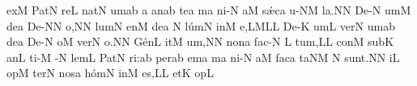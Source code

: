 \sgn {}ex\punctum M\egn
\spatium
\sgn P{a}t\punctum N\egn
\sgn re{}\punctum L\egn
\spatium
\sgn n{a}t\punctum N\egn
\sgn {}um\punctum a\augmentum b\egn
\spatium
\divisiominima
\spatium
\custos a
\lineaproxima
\sgn {}an\pes ab\egn
\sgn te{}\punctum a\egn
\spatium
{}m\punctum a\egn
\sgn ni-\punctum N\egn
\sgn {}a{}\punctum M\egn
\spatium
\sgn s{\'\ae}c\punctum a\egn
\sgn {}u-\clivis NM\egn
\sgn la.\punctum N\augmentum N\egn
\spatium
\divisiofinalis
\spatium
\sgn D{e}-\punctum N\egn
\sgn {}um\punctum M\egn
\spatium
\sgn de{}\punctum a\egn
\spatium
\sgn D{e}-\punctum N\augmentum N\egn
\sgn {}o,\punctum N\augmentum N\egn
\spatium
\divisiominima
\spatium
\sgn l{u}m\punctum N\egn
\sgn {}en\punctum M\egn
\spatium
\sgn de{}\punctum a\egn
\spatium
\custos N
\lineaproxima
\sgn l{\'u}m\punctum N\egn
\sgn {}in\punctum M\egn
\sgn {}e,\torculus LML\punctum L\egn
\spatium
\divisiominima
\spatium
\sgn D{e}-\punctum K\egn
\sgn {}um\punctum L\egn
\spatium
\sgn v{e}r\punctum N\egn
\sgn {}um\punctum a\augmentum b\egn
\spatium
\sgn de{}\punctum a\egn
\spatium
\sgn D{e}-\punctum N\egn
\sgn {}o{}\punctum M\egn
\spatium
\sgn v{e}r\punctum N\egn
\sgn {}o.\punctum N\augmentum N\egn
\spatium
\divisiofinalis
\spatium
\sgn G{\'e}n\punctum L\egn
\sgn {}it\punctum M\egn
\sgn {}u{m,}\punctum N\augmentum N\egn
\spatium
\sgn non\punctum a\egn
\spatium
\sgn f{a}{c-}\punctum N\egn
\custos L
\lineaproxima
\sgn tu{m,}\punctum L\augmentum L\egn
\spatium
\divisiominima
\spatium
\sgn con\punctum M\egn
\sgn sub\punctum K\egn
{}an\punctum L\egn
\sgn ti-\punctum M\egn
{}-\punctum N\egn
\sgn lem\punctum L\egn
\spatium
\sgn P{a}t\punctum N\egn
\sgn ri:\punctum a\augmentum b\egn
\spatium
\divisiominor
\spatium
\sgn per\pes ab\egn
\spatium
{}em\punctum a\egn
\spatium
{}m\punctum a\egn
\sgn ni-\punctum N\egn
\sgn {}a{}\punctum M\egn
\spatium
\sgn f{a}c\punctum a\egn
\sgn ta{}\clivis NM\egn
\spatium
\custos N
\lineaproxima
\sgn su{nt.}\punctum N\augmentum N\egn
\spatium
\divisiofinalis
\spatium
{}i{}\punctum L\egn
\spatium
{}op\punctum M\egn
\sgn ter\punctum N\egn
\spatium
\sgn nos\punctum a\egn
\spatium
\sgn h{\'o}m\punctum N\egn
\sgn {}in\punctum M\egn
\sgn {}e{s,}\punctum L\augmentum L\egn
\spatium
\divisiominima
\spatium
\sgn {}et\punctum K\egn
\spatium
{}op\punctum L\egn
